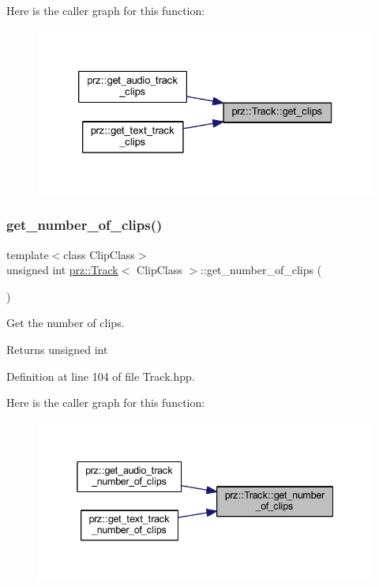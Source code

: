 Here is the caller graph for this function\+:
\nopagebreak
\begin{figure}[H]
\begin{center}
\leavevmode
\includegraphics[width=326pt]{classprz_1_1_track_a54eb44634d26680f1851077e64991419_icgraph}
\end{center}
\end{figure}
\mbox{\label{classprz_1_1_track_a776b6d37978d945f406fc4922981a2a1}} 
\subsubsection{\texorpdfstring{get\_number\_of\_clips()}{get\_number\_of\_clips()}}
{\footnotesize\ttfamily template$<$class Clip\+Class$>$ \\
unsigned int \mbox{\hyperlink{classprz_1_1_track}{prz\+::\+Track}}$<$ Clip\+Class $>$\+::get\+\_\+number\+\_\+of\+\_\+clips (\begin{DoxyParamCaption}{ }\end{DoxyParamCaption})\hspace{0.3cm}{\ttfamily [inline]}}



Get the number of clips. 

\begin{DoxyReturn}{Returns}
unsigned int 
\end{DoxyReturn}


Definition at line 104 of file Track.\+hpp.

Here is the caller graph for this function\+:
\nopagebreak
\begin{figure}[H]
\begin{center}
\leavevmode
\includegraphics[width=338pt]{classprz_1_1_track_a776b6d37978d945f406fc4922981a2a1_icgraph}
\end{center}
\end{figure}


